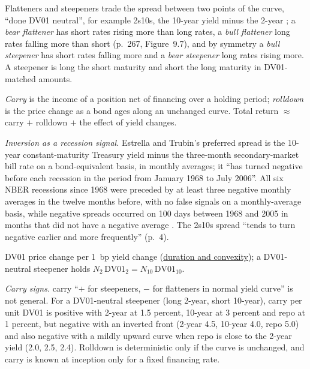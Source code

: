 \begin{qfmethod}\label{meth:curve-trades-carry-rolldown}
 Flatteners and steepeners trade the spread between two points of the curve, ``done DV01 neutral'', for example 2s10s, the 10-year yield minus the 2-year \citep[chap.~9, sec.\ ``Flatteners and Steepeners'', PDF pp.~266--267]{s7-gliner}; a \emph{bear flattener} has short rates rising more than long rates, a \emph{bull flattener} long rates falling more than short (p.~267, Figure~9.7), and by symmetry a \emph{bull steepener} has short rates falling more and a \emph{bear steepener} long rates rising more. A steepener is long the short maturity and short the long maturity in DV01-matched amounts.

\emph{Carry} is the income of a position net of financing over a holding period; \emph{rolldown} is the price change as a bond ages along an unchanged curve. Total return $\approx$ carry $+$ rolldown $+$ the effect of yield changes.

\emph{Inversion as a recession signal.} Estrella and Trubin's preferred spread is the 10-year constant-maturity Treasury yield minus the three-month secondary-market bill rate on a bond-equivalent basis, in monthly averages; it ``has turned negative before each recession in the period from January 1968 to July 2006''. All six NBER recessions since 1968 were preceded by at least three negative monthly averages in the twelve months before, with no false signals on a monthly-average basis, while negative spreads occurred on 100 days between 1968 and 2005 in months that did not have a negative average \citep[pp.~4--5]{estrella-trubin-2006}. The 2s10s spread ``tends to turn negative earlier and more frequently'' (p.~4).

 DV01 price change per 1~bp yield change (\hyperref[mod:duration-convexity]{duration and convexity}); a DV01-neutral steepener holds $N_2\,\mathrm{DV01}_2=N_{10}\,\mathrm{DV01}_{10}$.

 \emph{Carry signs.} carry ``$+$ for steepeners, $-$ for flatteners in normal yield curve'' is not general. For a DV01-neutral steepener (long 2-year, short 10-year), carry per unit DV01 is positive with 2-year at 1.5 percent, 10-year at 3 percent and repo at 1 percent, but negative with an inverted front (2-year 4.5, 10-year 4.0, repo 5.0) and also negative with a mildly upward curve when repo is close to the 2-year yield (2.0, 2.5, 2.4). Rolldown is deterministic only if the curve is unchanged, and carry is known at inception only for a fixed financing rate.


\end{qfmethod}
